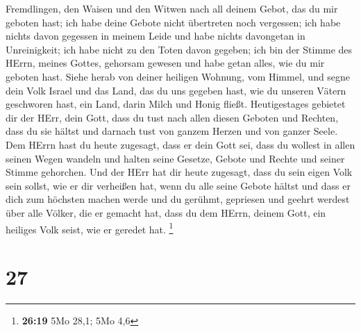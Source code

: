 Fremdlingen, den Waisen und den Witwen nach all deinem Gebot, das du mir
geboten hast; ich habe deine Gebote nicht übertreten noch vergessen;
 ich habe nichts davon gegessen in meinem Leide und habe
nichts davongetan in Unreinigkeit; ich habe nicht zu den Toten davon
gegeben; ich bin der Stimme des HErrn, meines Gottes, gehorsam gewesen
und habe getan alles, wie du mir geboten hast.  Siehe
herab von deiner heiligen Wohnung, vom Himmel, und segne dein Volk
Israel und das Land, das du uns gegeben hast, wie du unseren Vätern
geschworen hast, ein Land, darin Milch und Honig fließt. 
Heutigestages gebietet dir der HErr, dein Gott, dass du tust nach allen
diesen Geboten und Rechten, dass du sie hältst und darnach tust von
ganzem Herzen und von ganzer Seele.  Dem HErrn hast du
heute zugesagt, dass er dein Gott sei, dass du wollest in allen seinen
Wegen wandeln und halten seine Gesetze, Gebote und Rechte und seiner
Stimme gehorchen.  Und der HErr hat dir heute zugesagt,
dass du sein eigen Volk sein sollst, wie er dir verheißen hat, wenn du
alle seine Gebote hältst  und dass er dich zum höchsten
machen werde und du gerühmt, gepriesen und geehrt werdest über alle
Völker, die er gemacht hat, dass du dem HErrn, deinem Gott, ein heiliges
Volk seist, wie er geredet hat. \footnote{\textbf{26:19} 5Mo 28,1; 5Mo
  4,6}

\hypertarget{section-26}{%
\section{27}\label{section-26}}

